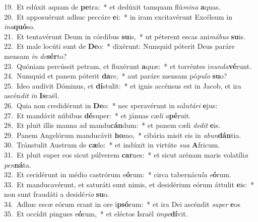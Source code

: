 {19.~}Et edúxit aquam de \textbf{pe}tra:~* et dedúxit tamquam flú\textit{mi}\textit{na} \textbf{a}quas.\\
{20.~}Et apposuérunt adhuc peccáre \textbf{e}i:~* in iram excitavérunt Excélsum in \textit{i}\textit{na}\textbf{quó}so.\\
{21.~}Et tentavérunt Deum in córdibus \textbf{su}is,~* ut péterent escas ani\textit{má}\textit{bus} \textbf{su}is.\\
{22.~}Et male locúti sunt de \textbf{De}o:~* dixérunt: Numquid póterit Deus paráre mensam \textit{in} \textit{de}\textbf{sér}to?\\
{23.~}Quóniam percússit petram, et fluxérunt \textbf{a}quæ:~* et torréntes i\textit{nun}\textit{da}\textbf{vé}runt.\\
{24.~}Numquid et panem póterit \textbf{da}re,~* aut paráre mensam pó\textit{pu}\textit{lo} \textbf{su}o?\\
{25.~}Ideo audívit Dóminus, et \textbf{dí}stulit:~* et ignis accénsus est in Jacob, et ira ascén\textit{dit} \textit{in} \textbf{Is}raël.\\
{26.~}Quia non credidérunt in \textbf{De}o:~* nec speravérunt in salu\textit{tá}\textit{ri} \textbf{e}jus:\\
{27.~}Et mandávit núbibus \textbf{dé}super:~* et jánuas cæ\textit{li} \textit{a}\textbf{pé}ruit.\\
{28.~}Et pluit illis manna ad mandu\textbf{cán}dum:~* et panem cæli \textit{de}\textit{dit} \textbf{e}is.\\
{29.~}Panem Angelórum manducávit \textbf{ho}mo,~* cibária misit eis in \textit{a}\textit{bun}\textbf{dán}tia.\\
{30.~}Tránstulit Austrum de \textbf{cæ}lo:~* et indúxit in virtúte \textit{su}\textit{a} \textbf{A}fricum.\\
{31.~}Et pluit super eos sicut púlverem \textbf{car}nes:~* et sicut arénam maris volatíli\textit{a} \textit{pen}\textbf{ná}ta.\\
{32.~}Et cecidérunt in médio castrórum e\textbf{ó}rum:~* circa tabernácu\textit{la} \textit{e}\textbf{ó}rum.\\
{33.~}Et manducavérunt, et saturáti sunt nimis, et desidérium eórum áttulit \textbf{e}is:~* non sunt fraudáti a desidé\textit{ri}\textit{o} \textbf{su}o.\\
{34.~}Adhuc escæ eórum erant in ore i\textbf{psó}rum:~* et ira Dei ascéndit \textit{su}\textit{per} \textbf{e}os\\
{35.~}Et occídit pingues e\textbf{ó}rum,~* et eléctos Israël \textit{im}\textit{pe}\textbf{dí}vit.\\
